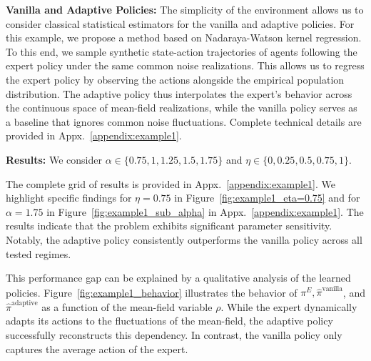 \documentclass{article}
\theoremstyle{plain}
\begin{document}
\noindent\textbf{Vanilla and Adaptive Policies:}
The simplicity of the environment allows us to consider classical statistical estimators for the vanilla and adaptive policies. For this example, we propose a method based on Nadaraya-Watson kernel regression. To this end, we sample synthetic state-action trajectories of agents following the expert policy under the same common noise realizations. This allows us to regress the expert policy by observing the actions alongside the empirical population distribution. The adaptive policy thus interpolates the expert's behavior across the continuous space of mean-field realizations, while the vanilla policy serves as a baseline that ignores common noise fluctuations. Complete technical details are provided in Appx.~\ref{appendix:example1}.

\noindent\textbf{Results:} We consider $\alpha \in \{0.75, 1, 1.25, 1.5, 1.75\}$ and $\eta \in \{0, 0.25, 0.5, 0.75, 1\}$. 

The complete grid of results is provided in Appx.~\ref{appendix:example1}. We highlight specific findings for $\eta = 0.75$ in Figure~\ref{fig:example1_eta=0.75} and for $\alpha = 1.75$ in Figure~\ref{fig:example1_sub_alpha} in Appx.~\ref{appendix:example1}. The results indicate that the problem exhibits significant parameter sensitivity. Notably, the adaptive policy consistently outperforms the vanilla policy across all tested regimes. 

This performance gap can be explained by a qualitative analysis of the learned policies. Figure~\ref{fig:example1_behavior} illustrates the behavior of $\pi^E, \hat{\pi}^{\text{vanilla}}$, and $\hat{\pi}^{\text{adaptive}}$ as a function of the mean-field variable $\rho$. While the expert dynamically adapts its actions to the fluctuations of the mean-field, the adaptive policy successfully reconstructs this dependency. In contrast, the vanilla policy only captures the average action of the expert.
\end{document}
